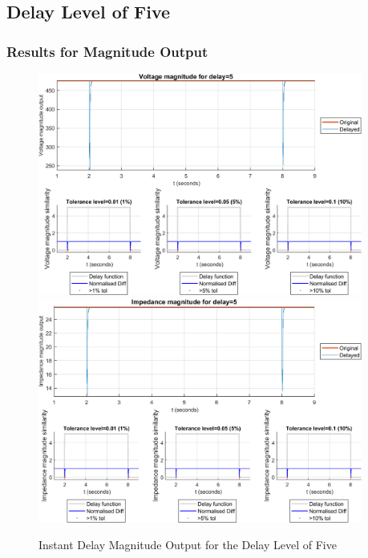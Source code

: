 \subsection{Delay Level of Five}
\subsubsection{Results for Magnitude Output}

\begin{figure}
    \caption{Instant Delay Magnitude Output for the Delay Level of Five}
    \includegraphics[width=0.95\textwidth]{PMUsim-figures/DelayOf_5/Instant_vMagnitude.png}    
      \includegraphics[width=0.95\textwidth]{PMUsim-figures/DelayOf_5/Instant_iMagnitude.png}     
    \label{fig:PMUsim_Five_Magnitude}
    \begin{small}
     \end{small}
\end{figure}

